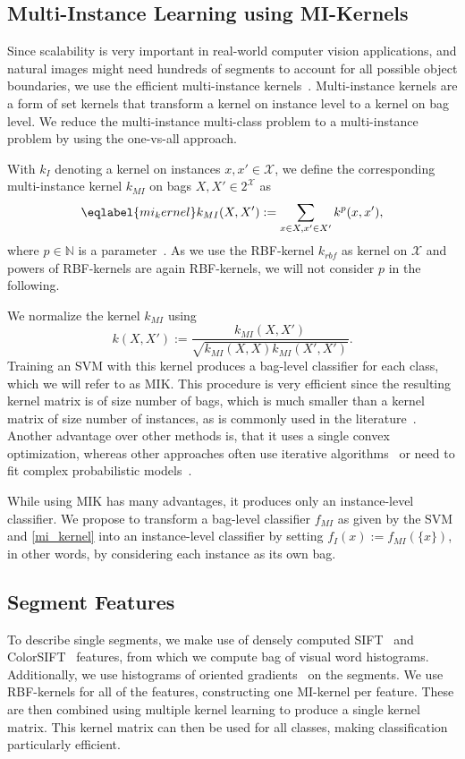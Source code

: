 \subsection{Multi-Instance Learning using MI-Kernels}
Since scalability is very important in real-world computer vision
applications, and natural images might need hundreds of segments to
account for all possible object boundaries, we use the efficient
multi-instance kernels~\citep{gaertner2002multi}.
Multi-instance kernels are a form of set kernels that transform a kernel
on instance level to a kernel on bag level.
We reduce the multi-instance multi-class problem to a multi-instance problem by using the one-vs-all approach.

With $k_I$ denoting a kernel on instances $x,x' \in \mathcal{X}$, we define the corresponding multi-instance kernel $k_{MI}$ on bags $X,X' \in 2^\mathcal{X}$
as
\begin{equation}\eqlabel{mi_kernel}
k_{MI}(X,X') := \sum_{x \in X, x' \in X'} k^p(x,x'),
\end{equation}
where $p \in \mathbb{N}$ is a parameter~\citep{gaertner2002multi}. As we use the RBF-kernel $k_{rbf}$ as kernel on $\mathcal{X}$ and powers of RBF-kernels
are again RBF-kernels, we will not consider $p$ in the following.

We normalize the kernel $k_{MI}$ \citep{gaertner2002multi} using
\begin{equation}
k(X,X') := \frac{k_{MI}(X,X')}{\sqrt{k_{MI}(X,X)k_{MI}(X',X')}}.
\end{equation}
Training an SVM with this kernel produces a bag-level classifier for each class, which we will refer to as MIK.
This procedure is very efficient since the resulting kernel matrix is of size
number of bags, which is much smaller than a kernel matrix of size number of
instances, as is commonly used in the
literature~\citep{andrews2003support,nguyen2010new,zhang2008m3miml}.  Another
advantage over other methods is, that it uses a single convex optimization,
whereas other approaches often use iterative algorithms~\citep{andrews2003support} or need to fit complex
probabilistic models~\citep{zha2008joint}.

While using MIK has many advantages, it produces only an instance-level
classifier. We propose to transform a bag-level classifier $f_{MI}$ as given by
the SVM and \eqref{mi_kernel} into an instance-level classifier by setting
$f_{I}(x):=f_{MI}(\{x\})$, in other words, by considering each instance as its own
bag. 

\subsection{Segment Features}
To describe single segments, we make use of densely computed SIFT~\citep{lowe2004distinctive} and ColorSIFT~\citep{van2009evaluating} features, from which
we compute bag of visual word histograms. Additionally, we use histograms of oriented gradients~\citep{dalal2005histograms} on the segments.
We use RBF-kernels for all of the features,
constructing one MI-kernel per feature. These are then combined using multiple kernel
learning to produce a single kernel matrix. This kernel matrix can then be used for all classes,
making classification particularly efficient.


